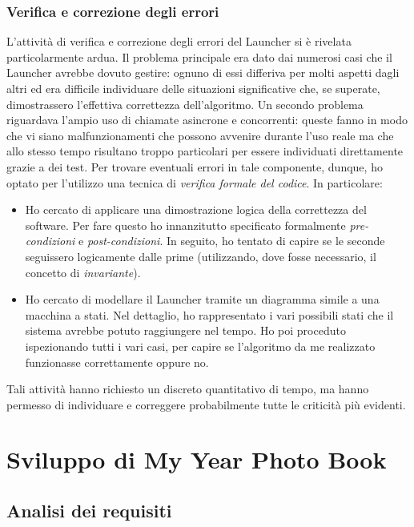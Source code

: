 			\subsubsection{Verifica e correzione degli errori}
				L'attività di verifica e correzione degli errori del Launcher si è rivelata particolarmente ardua. Il problema
				principale era dato dai numerosi casi che il Launcher avrebbe dovuto gestire: ognuno di essi differiva per molti
				aspetti dagli altri ed era difficile individuare delle situazioni significative che, se superate, dimostrassero
				l'effettiva correttezza dell'algoritmo. Un secondo problema riguardava l'ampio uso di chiamate asincrone e
				concorrenti: queste fanno in modo che vi siano malfunzionamenti che possono avvenire durante l'uso reale ma che allo
				stesso tempo risultano troppo particolari per essere individuati direttamente grazie a dei test.
				Per trovare eventuali errori in tale componente, dunque, ho optato per l'utilizzo una tecnica di
				\emph{verifica formale del codice}. In particolare:
				\begin{itemize}
					\item Ho cercato di applicare una dimostrazione logica della correttezza del software. Per fare questo ho
					innanzitutto specificato formalmente \emph{pre-condizioni} e \emph{post-condizioni}. In
					seguito, ho tentato di capire se le seconde seguissero logicamente dalle prime (utilizzando, dove fosse
					necessario, il concetto di \emph{invariante}).
					\item Ho cercato di modellare il Launcher tramite un diagramma simile a una macchina a stati. Nel dettaglio,
					ho rappresentato i vari possibili stati che il sistema avrebbe potuto raggiungere nel tempo. Ho poi proceduto
					ispezionando tutti i vari casi, per capire se l'algoritmo da me realizzato funzionasse correttamente oppure
					no.
				\end{itemize}
				Tali attività hanno richiesto un discreto quantitativo di tempo, ma hanno permesso di individuare
				e correggere probabilmente tutte le criticità più evidenti.
	\section{Sviluppo di My Year Photo Book}
		\subsection{Analisi dei requisiti}
